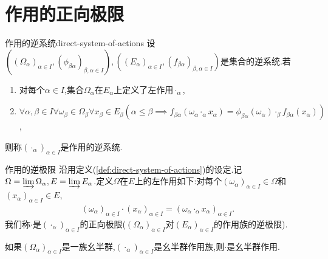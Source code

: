 \section{作用的正向极限}

\begin{definition}{作用的逆系统}{direct-system-of-actions}
	设$\left(\left(\Omega_{\alpha}\right)_{\alpha\in I},\left(\phi_{\beta\alpha}\right)_{\beta,\alpha\in I}\right),\left(\left(E_{\alpha}\right)_{\alpha\in I},\left(f_{\beta\alpha}\right)_{\beta,\alpha\in I}\right)$是集合的逆系统.若
	\begin{enumerate}
		\item 对每个$\alpha\in I$,集合$\Omega_{\alpha}$在$E_{\alpha}$上定义了左作用$\cdot_{\alpha}$,
		\item $\forall\alpha,\beta\in I\forall \omega_{\beta}\in\Omega_{\beta}\forall x_{\beta}\in E_{\beta}\left(\alpha\leq\beta\implies f_{\beta\alpha}\left(\omega_{\alpha}\cdot_{\alpha}x_{\alpha}\right)=\phi_{\beta\alpha}\left(\omega_{\alpha}\right)\cdot_{\beta}f_{\beta\alpha}\left(x_{\alpha}\right)\right)$,
	\end{enumerate}
	则称$\left(\cdot_{\alpha}\right)_{\alpha\in I}$是作用的逆系统.
\end{definition}

\begin{definition}{作用的逆极限}{}
	沿用定义(\cref{def:direct-system-of-actions})的设定.记$\Omega=\varinjlim\Omega_{\alpha},E=\varinjlim E_{\alpha}$.定义$\Omega$在$E$上的左作用如下:对每个$\left(\omega_{\alpha}\right)_{\alpha\in I}\in\Omega$和$\left(x_{\alpha}\right)_{\alpha\in I}\in E$,
	\begin{align*}
		\left(\omega_{\alpha}\right)_{\alpha\in I}\cdot\left(x_{\alpha}\right)_{\alpha\in I}=\left(\omega_{\alpha}\cdot_{\alpha}x_{\alpha}\right)_{\alpha\in I}.
	\end{align*}
	我们称$\cdot$是$\left(\cdot_{\alpha}\right)_{\alpha\in I}$的正向极限($\left(\Omega_{\alpha}\right)_{\alpha\in I}$对$\left(E_{\alpha}\right)_{\alpha\in I}$的作用族的逆极限).
\end{definition}

\begin{remark}{}{}
	如果$\left(\Omega_{\alpha}\right)_{\alpha\in I}$是一族幺半群,$\left(\cdot_{\alpha}\right)_{\alpha\in I}$是幺半群作用族,则$\cdot$是幺半群作用.
\end{remark}

